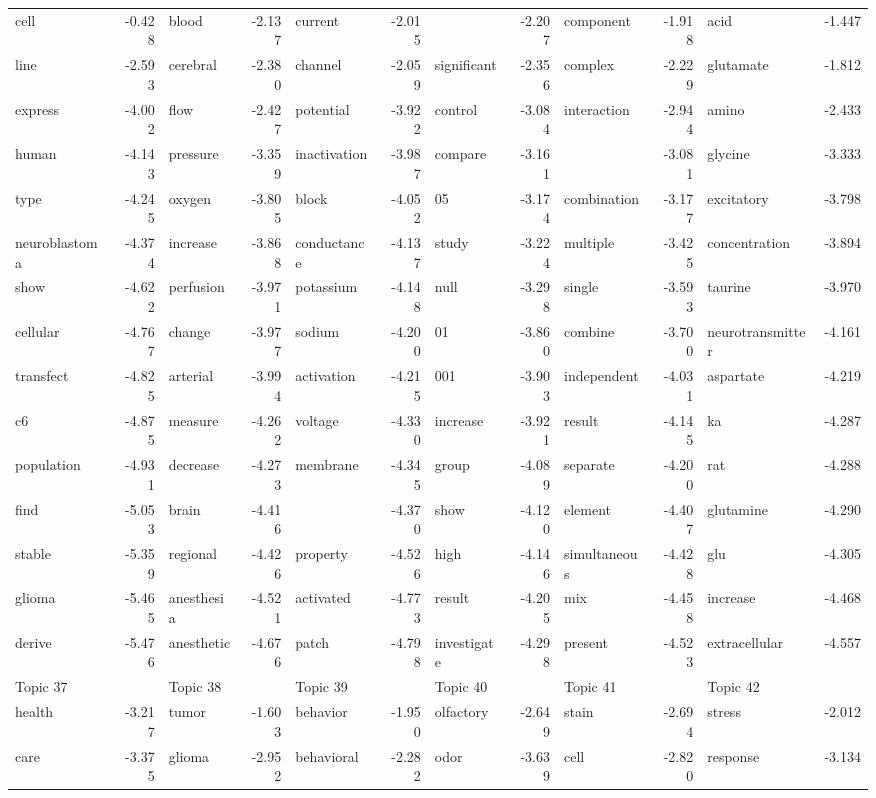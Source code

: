 \documentclass{article}
\begin{document}
\begin{table}
{\begin{tabular}{|l r|l r|l r|l r|l r|l r|}
\hline
cell & -0.428 & blood & -2.137 & current & -2.015 &  & -2.207 & component & -1.918 & acid & -1.447\\
line & -2.593 & cerebral & -2.380 & channel & -2.059 & significant & -2.356 & complex & -2.229 & glutamate & -1.812\\
express & -4.002 & flow & -2.427 & potential & -3.922 & control & -3.084 & interaction & -2.944 & amino & -2.433\\
human & -4.143 & pressure & -3.359 & inactivation & -3.987 & compare & -3.161 &  & -3.081 & glycine & -3.333\\
type & -4.245 & oxygen & -3.805 & block & -4.052 & 05 & -3.174 & combination & -3.177 & excitatory & -3.798\\
neuroblastoma & -4.374 & increase & -3.868 & conductance & -4.137 & study & -3.224 & multiple & -3.425 & concentration & -3.894\\
show & -4.622 & perfusion & -3.971 & potassium & -4.148 & null & -3.298 & single & -3.593 & taurine & -3.970\\
cellular & -4.767 & change & -3.977 & sodium & -4.200 & 01 & -3.860 & combine & -3.700 & neurotransmitter & -4.161\\
transfect & -4.825 & arterial & -3.994 & activation & -4.215 & 001 & -3.903 & independent & -4.031 & aspartate & -4.219\\
c6 & -4.875 & measure & -4.262 & voltage & -4.330 & increase & -3.921 & result & -4.145 & ka & -4.287\\
population & -4.931 & decrease & -4.273 & membrane & -4.345 & group & -4.089 & separate & -4.200 & rat & -4.288\\
find & -5.053 & brain & -4.416 &  & -4.370 & show & -4.120 & element & -4.407 & glutamine & -4.290\\
stable & -5.359 & regional & -4.426 & property & -4.526 & high & -4.146 & simultaneous & -4.428 & glu & -4.305\\
glioma & -5.465 & anesthesia & -4.521 & activated & -4.773 & result & -4.205 & mix & -4.458 & increase & -4.468\\
derive & -5.476 & anesthetic & -4.676 & patch & -4.798 & investigate & -4.298 & present & -4.523 & extracellular & -4.557\\
\hline
\hline
Topic 37 & &Topic 38 & &Topic 39 & &Topic 40 & &Topic 41 & &Topic 42 &\\
\hline
health & -3.217 & tumor & -1.603 & behavior & -1.950 & olfactory & -2.649 & stain & -2.694 & stress & -2.012\\
care & -3.375 & glioma & -2.952 & behavioral & -2.282 & odor & -3.639 & cell & -2.820 & response & -3.134\\

\end{tabular}}
\end{table}
\end{document}
